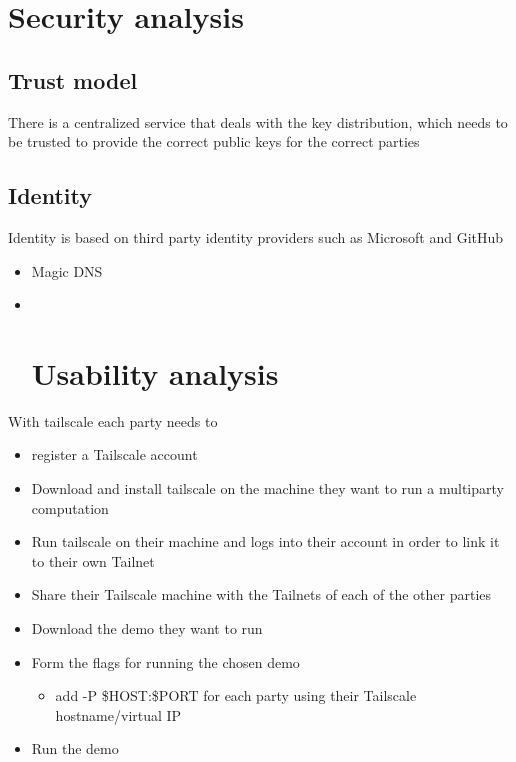 \hypertarget{security-analysis}{%
\section{Security analysis}\label{security-analysis}}

\hypertarget{trust-model}{%
\subsection{Trust model}\label{trust-model}}

There is a centralized service that deals with the key distribution,
which needs to be trusted to provide the correct public keys for the
correct parties

\hypertarget{identity}{%
\subsection{Identity}\label{identity}}

Identity is based on third party identity providers such as Microsoft
and GitHub

\begin{itemize}
\item
  Magic DNS
\item ~
  \hypertarget{usability-analysis}{%
  \section{Usability analysis}\label{usability-analysis}}
\end{itemize}

With tailscale each party needs to

\begin{itemize}
\tightlist
\item
  register a Tailscale account
\item
  Download and install tailscale on the machine they want to run a
  multiparty computation
\item
  Run tailscale on their machine and logs into their account in order to
  link it to their own Tailnet
\item
  Share their Tailscale machine with the Tailnets of each of the other
  parties
\item
  Download the demo they want to run
\item
  Form the flags for running the chosen demo

  \begin{itemize}
  \tightlist
  \item
    add -P \$HOST:\$PORT for each party using their Tailscale
    hostname/virtual IP
  \end{itemize}
\item
  Run the demo
\end{itemize}

